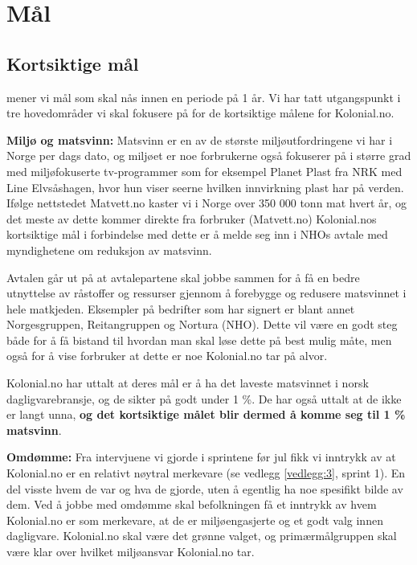 \chapter{Mål}

\section{\textbf{Kortsiktige mål}}
 mener vi mål som skal nås innen en periode på 1 år. Vi har tatt utgangspunkt i tre hovedområder vi skal fokusere på for de kortsiktige målene for Kolonial.no.

\textbf{Miljø og matsvinn:}
Matsvinn er en av de største miljøutfordringene vi har i Norge per dags dato, og miljøet er noe forbrukerne også fokuserer på i større grad med miljøfokuserte tv-programmer som for eksempel Planet Plast fra NRK med Line Elvsåshagen, hvor hun viser seerne hvilken innvirkning plast har på verden. Ifølge nettstedet Matvett.no kaster vi i Norge over 350 000 tonn mat hvert år, og det meste av dette kommer direkte fra forbruker (Matvett.no) Kolonial.nos kortsiktige mål i forbindelse med dette er å melde seg inn i NHOs avtale med myndighetene om reduksjon av matsvinn.

Avtalen går ut på at avtalepartene skal jobbe sammen for å få en bedre utnyttelse av råstoffer og ressurser gjennom å forebygge og redusere matsvinnet i hele matkjeden. Eksempler på bedrifter som har signert er blant annet Norgesgruppen, Reitangruppen og Nortura (NHO). Dette vil være en godt steg både for å få bistand til hvordan man skal løse dette på best mulig måte, men også for å vise forbruker at dette er noe Kolonial.no tar på alvor.

Kolonial.no har uttalt at deres mål er å ha det laveste matsvinnet i norsk dagligvarebransje, og de sikter på godt under 1 \%. De har også uttalt at de ikke er langt unna, \textbf{og det kortsiktige målet blir dermed å komme seg til 1 \% matsvinn}. 

\textbf{Omdømme:}
Fra intervjuene vi gjorde i sprintene før jul fikk vi inntrykk av at Kolonial.no er en relativt nøytral merkevare (se vedlegg \ref{vedlegg:3}, sprint 1). En del visste hvem de var og hva de gjorde, uten å egentlig ha noe spesifikt bilde av dem. Ved å jobbe med omdømme skal befolkningen få et inntrykk av hvem Kolonial.no er som merkevare, at de er miljøengasjerte og et godt valg innen dagligvare. Kolonial.no skal være det grønne valget, og primærmålgruppen skal være klar over hvilket miljøansvar Kolonial.no tar.

